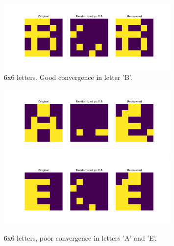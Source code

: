 \documentclass[11pt]{article}
\begin{document}
	\begin{figure}
	\begin{center}
	\includegraphics[width=0.8\textwidth]{"../img/letters_result_B.png"} %
	\caption{ 6x6 letters. Good convergence in letter 'B'.}
	\label{fig:letters_good}
	\end{center}	
	\end{figure}

	\begin{figure}
	\begin{center}
	\includegraphics[width=0.8\textwidth]{"../img/letters_result_A.png"}  %
	\includegraphics[width=0.8\textwidth]{"../img/letters_result_E.png"}
	\caption{6x6 letters, poor convergence in letters 'A' and 'E'.}
	\label{fig:letters_bad}
	\end{center}	
	\end{figure}
\end{document}
